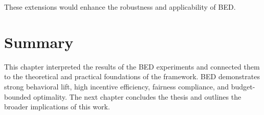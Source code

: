 These extensions would enhance the robustness and applicability of BED.

\section{Summary}

This chapter interpreted the results of the BED experiments and connected them
to the theoretical and practical foundations of the framework. BED demonstrates
strong behavioral lift, high incentive efficiency, fairness compliance, and
budget-bounded optimality. The next chapter concludes the thesis and outlines
the broader implications of this work.
